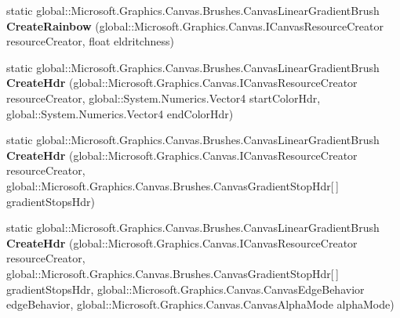 \begin{DoxyCompactItemize}
\item 
\mbox{\label{class_microsoft_1_1_graphics_1_1_canvas_1_1_brushes_1_1_canvas_linear_gradient_brush_a521b2a32aa6e7539839397dae253b7a8}} 
static global\+::\+Microsoft.\+Graphics.\+Canvas.\+Brushes.\+Canvas\+Linear\+Gradient\+Brush {\bfseries Create\+Rainbow} (global\+::\+Microsoft.\+Graphics.\+Canvas.\+I\+Canvas\+Resource\+Creator resource\+Creator, float eldritchness)
\item 
\mbox{\label{class_microsoft_1_1_graphics_1_1_canvas_1_1_brushes_1_1_canvas_linear_gradient_brush_a1164597be8c9b0ac875ac18fdb1f8965}} 
static global\+::\+Microsoft.\+Graphics.\+Canvas.\+Brushes.\+Canvas\+Linear\+Gradient\+Brush {\bfseries Create\+Hdr} (global\+::\+Microsoft.\+Graphics.\+Canvas.\+I\+Canvas\+Resource\+Creator resource\+Creator, global\+::\+System.\+Numerics.\+Vector4 start\+Color\+Hdr, global\+::\+System.\+Numerics.\+Vector4 end\+Color\+Hdr)
\item 
\mbox{\label{class_microsoft_1_1_graphics_1_1_canvas_1_1_brushes_1_1_canvas_linear_gradient_brush_a5aac477d60f1a54fac610c89d85f7c46}} 
static global\+::\+Microsoft.\+Graphics.\+Canvas.\+Brushes.\+Canvas\+Linear\+Gradient\+Brush {\bfseries Create\+Hdr} (global\+::\+Microsoft.\+Graphics.\+Canvas.\+I\+Canvas\+Resource\+Creator resource\+Creator, global\+::\+Microsoft.\+Graphics.\+Canvas.\+Brushes.\+Canvas\+Gradient\+Stop\+Hdr\mbox{[}$\,$\mbox{]} gradient\+Stops\+Hdr)
\item 
\mbox{\label{class_microsoft_1_1_graphics_1_1_canvas_1_1_brushes_1_1_canvas_linear_gradient_brush_a1a0104bd1c67e8ce9f314d0238d4aca4}} 
static global\+::\+Microsoft.\+Graphics.\+Canvas.\+Brushes.\+Canvas\+Linear\+Gradient\+Brush {\bfseries Create\+Hdr} (global\+::\+Microsoft.\+Graphics.\+Canvas.\+I\+Canvas\+Resource\+Creator resource\+Creator, global\+::\+Microsoft.\+Graphics.\+Canvas.\+Brushes.\+Canvas\+Gradient\+Stop\+Hdr\mbox{[}$\,$\mbox{]} gradient\+Stops\+Hdr, global\+::\+Microsoft.\+Graphics.\+Canvas.\+Canvas\+Edge\+Behavior edge\+Behavior, global\+::\+Microsoft.\+Graphics.\+Canvas.\+Canvas\+Alpha\+Mode alpha\+Mode)

\end{DoxyCompactItemize}
